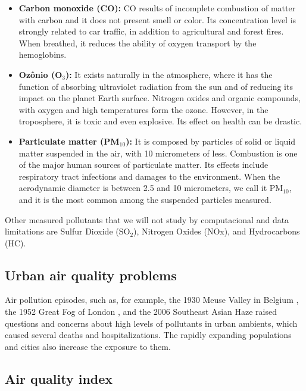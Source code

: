 \begin{itemize}
    \item \textbf{Carbon monoxide (CO):} CO results of incomplete combustion
    of matter with carbon and it does not present smell or color. Its
    concentration level is strongly related to car traffic, in addition to
    agricultural and forest fires. When breathed, it reduces the ability of
    oxygen transport by the hemoglobins.  

    \item \textbf{Ozônio (O$_3$):} It exists naturally in the atmosphere,
    where it has the function of absorbing ultraviolet radiation from the sun
    and of reducing its impact on the planet Earth surface. Nitrogen oxides and
    organic compounds, with oxygen and high temperatures form the ozone. However, in
    the troposphere, it is toxic and even explosive. Its
    effect on health can be drastic. 

    \item \textbf{Particulate matter (PM$_{10}$):} It is composed by particles
    of solid or liquid matter suspended in the air, with 10 micrometers of
    less. Combustion is one of the major human sources of particulate matter.
    Its effects include respiratory tract infections and damages to the
    environment. When the aerodynamic diameter is between 2.5 and 10
    micrometers, we call it PM$_10$, and it is the most common among the
    suspended particles measured.  

\end{itemize}

Other measured pollutants that we will not study by computacional and data
limitations are Sulfur Dioxide (SO$_2$), Nitrogen Oxides (NOx), and Hydrocarbons (HC).

\subsection{Urban air quality problems}

Air pollution episodes, such as, for example, the 1930 Meuse Valley in Belgium
\cite{nemery2001}, the 1952 Great Fog of London
\cite{polivka2018}, and the 2006 Southeast Asian Haze \cite{jones2006} raised
questions and concerns about high levels of pollutants in urban ambients,
which caused several deaths and hospitalizations. The rapidly expanding
populations and cities also increase the exposure to them.


\subsection{Air quality index}

